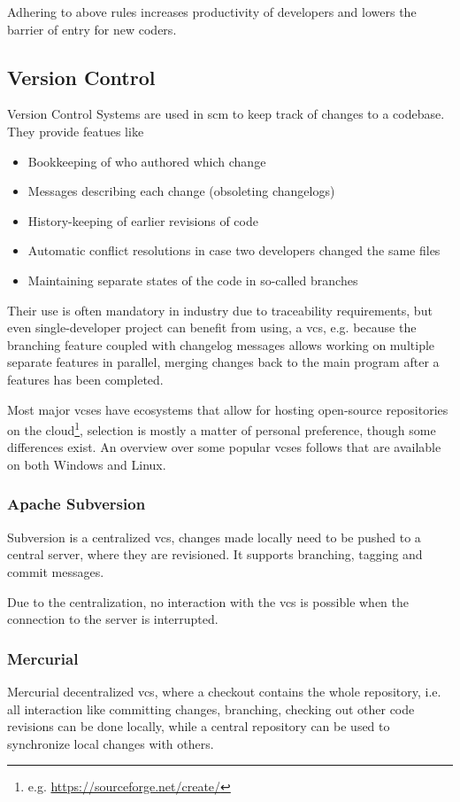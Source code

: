 Adhering to above rules increases productivity of developers and lowers the barrier of entry for new coders.

\subsection{Version Control}
\gls{Version Control System}s  are used in \gls{scm} to keep track of changes to a codebase. They provide featues like
\begin{itemize}
	\item Bookkeeping of who authored which change
	\item Messages describing each change (obsoleting changelogs)
	\item History-keeping of earlier revisions of code
	\item Automatic conflict resolutions in case two developers changed the same files
	\item Maintaining separate states of the code in so-called branches
\end{itemize}

Their use is often mandatory in industry due to traceability requirements, but even single-developer project can benefit from using, a \gls{vcs}, e.g. because the branching feature coupled with changelog messages allows working on multiple separate features in parallel, merging changes back to the main program after a features has been completed. 

Most major \gls{vcs}es have ecosystems that allow for hosting open-source repositories on the \gls{cloud}\footnote{e.g. \url{https://sourceforge.net/create/}}, selection is mostly a matter of personal preference, though some differences exist.
An overview over some popular \gls{vcs}es follows that are available on both Windows and Linux.

\subsubsection{Apache Subversion}
Subversion is a centralized \gls{vcs}, changes made locally need to be pushed to a central server, where they are revisioned. It supports branching, tagging and commit messages.

Due to the centralization, no interaction with the \gls{vcs} is possible when the connection to the server is interrupted.

\subsubsection{Mercurial}
Mercurial decentralized \gls{vcs}, where a checkout contains the whole repository, i.e. all interaction like committing changes, branching, checking out other code revisions can be done locally, while a central repository can be used to synchronize local changes with others.

